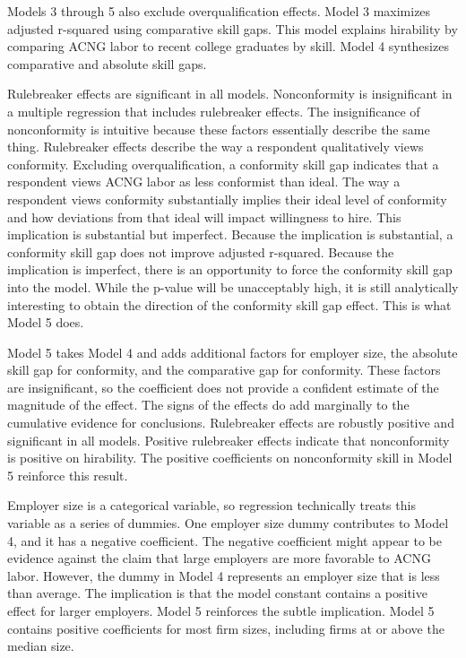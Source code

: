 Models 3 through 5 also exclude overqualification effects.
Model 3 maximizes adjusted r-squared using comparative skill gaps.
This model explains hirability by comparing ACNG labor to recent college graduates by skill.
Model 4 synthesizes comparative and absolute skill gaps.



Rulebreaker effects are significant in all models.
Nonconformity is insignificant in a multiple regression that includes rulebreaker effects.
The insignificance of nonconformity is intuitive because these factors essentially describe the same thing.
Rulebreaker effects describe the way a respondent qualitatively views conformity.
Excluding overqualification, a conformity skill gap indicates that a respondent views ACNG labor as less conformist than ideal.
The way a respondent views conformity substantially implies their ideal level of conformity and how deviations from that ideal will impact willingness to hire.
This implication is substantial but imperfect.
Because the implication is substantial, a conformity skill gap does not improve adjusted r-squared.
Because the implication is imperfect, there is an opportunity to force the conformity skill gap into the model.
While the p-value will be unacceptably high, it is still analytically interesting to obtain the direction of the conformity skill gap effect.
This is what Model 5 does.

Model 5 takes Model 4 and adds additional factors for employer size,
the absolute skill gap for conformity,
and the comparative gap for conformity.
These factors are insignificant, so the coefficient does not provide a confident estimate of the magnitude of the effect.
The signs of the effects do add marginally to the cumulative evidence for conclusions.
Rulebreaker effects are robustly positive and significant in all models.
Positive rulebreaker effects indicate that nonconformity is positive on hirability.
The positive coefficients on nonconformity skill in Model 5 reinforce this result.

Employer size is a categorical variable, so regression technically treats this variable as a series of dummies.
One employer size dummy contributes to Model 4, and it has a negative coefficient.
The negative coefficient might appear to be evidence against the claim that large employers
are more favorable to ACNG labor.
However, the dummy in Model 4 represents an employer size that is less than average.
The implication is that the model constant contains a positive effect for larger employers.
Model 5 reinforces the subtle implication.
Model 5 contains positive coefficients for most firm sizes, including firms at or above the median size.

